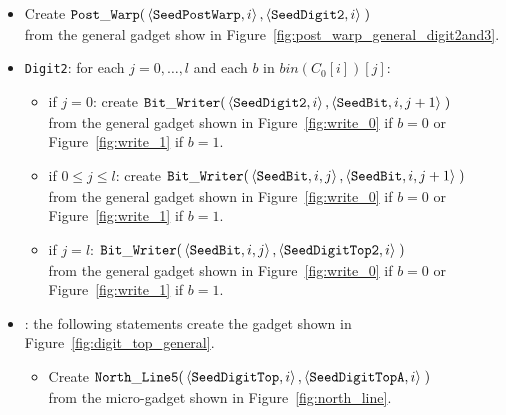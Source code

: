 \begin{itemize}
    \item Create
    $\begin{aligned}[t]
        {\tt Post\_Warp}(&\left\langle {\tt SeedPostWarp},   i \right\rangle,
                   \left\langle {\tt SeedDigit2},   i \right\rangle \;)
    \end{aligned}$\\ from the general gadget show in Figure~\ref{fig:post_warp_general_digit2and3}.

    \item {\tt Digit2}: for each $j=0,\ldots,l$ and each $b$ in $bin(C_0[i])[j]$:
    \begin{itemize}
        \item if $j = 0$: create
        $\begin{aligned}[t]
            {\tt Bit\_Writer}(&\left\langle {\tt SeedDigit2}, i \right\rangle, \left\langle {\tt SeedBit}, i, j + 1 \right\rangle \;)
        \end{aligned}$\\ from the general gadget shown in Figure~\ref{fig:write_0} if $b = 0$ or Figure~\ref{fig:write_1} if $b = 1$.

        \item if $0 \leqslant j \leqslant l$: create
        $\begin{aligned}[t]
            {\tt Bit\_Writer}(&\left\langle {\tt SeedBit}, i, j \right\rangle, \left\langle {\tt SeedBit}, i, j + 1 \right\rangle \;)
        \end{aligned}$\\ from the general gadget shown in Figure~\ref{fig:write_0} if $b = 0$ or Figure~\ref{fig:write_1} if $b = 1$.

        \item if $j = l$:
        $\begin{aligned}[t]
            {\tt Bit\_Writer}(&\left\langle {\tt SeedBit}, i, j \right\rangle, \left\langle {\tt SeedDigitTop2}, i \right\rangle \;)
        \end{aligned}$\\ from the general gadget shown in Figure~\ref{fig:write_0} if $b = 0$ or Figure~\ref{fig:write_1} if $b = 1$.
    \end{itemize}


    \item {\dtop}: the following statements create the gadget shown in Figure~\ref{fig:digit_top_general}.
    \begin{itemize}
        \item Create
        $\begin{aligned}[t]
            {\tt North\_Line5}(& \left \langle {\tt SeedDigitTop},  i \right\rangle,
                                 \left \langle {\tt SeedDigitTopA}, i \right\rangle \;)
        \end{aligned}$\\ from the micro-gadget shown in Figure~\ref{fig:north_line}.


\end{itemize}
\end{itemize}
